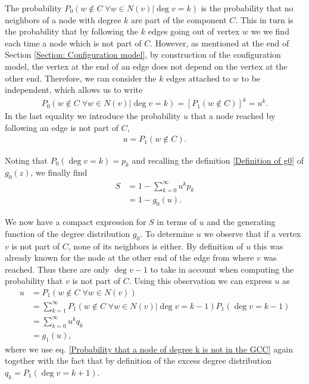 \documentclass[
11pt, %
american, %
singlespacing, %
final, %
nolistspacing, %
liststotoc, %
headsepline, %
]{MastersDoctoralThesis} %
\begin{document}
The probability $P_0(w \notin C\; \forall w \in N(v)|\deg{v} = k)$ is the probability that no neighbors of a node with degree $k$ are part of the component $C$. This in turn is the probability that by following the $k$ edges going out of vertex $w$ we we find each time a node which is not part of $C$. However, as mentioned at the end of Section \ref{Section: Configuration model}, by construction of the configuration model, the vertex at the end of an edge does not depend on the vertex at the other end. Therefore, we can consider the $k$ edges attached to $w$ to be independent, which allows us to write
\begin{align}
	P_0(w \notin C\; \forall w \in N(v)|\deg{v} = k) = \left[P_1(w \notin C)\right]^k = u^k. \label{Probability that a node of degree k is not in the GCC}
\end{align}
In the last equality we introduce the probability $u$ that a node reached by following an edge is not part of $C$,
\begin{align}
	u = P_1(w \notin C). \label{Definition of u}
\end{align}

Noting that $P_0(\deg{v} = k) = p_k$ and recalling the definition \eqref{Definition of g0} of $g_0(z)$, we finally find
\begin{align}
	S	&= 1 - \sum_{k=0}^\infty u^k p_k \\
		&= 1 - g_0(u).
\end{align}

We now have a compact expression for $S$ in terms of $u$ and the generating function of the degree distribution $g_0$. To determine $u$ we observe that if a vertex $v$ is not part of $C$, none of its neighbors is either. By definition of $u$ this was already known for the node at the other end of the edge from where $v$ was reached. Thus there are only $\deg{v} - 1$ to take in account when computing the probability that $v$ is not part of $C$. Using this observation we can express $u$ as
\begin{align}
	u 	&= P_1(w \notin C \; \forall w \in N(v)) \\
		&= \sum_{k=1}^\infty P_1(w \notin C \; \forall w \in N(v)| \deg{v} = k - 1) P_1(\deg{v} = k - 1) \\
		&= \sum_{k=0}^\infty u^k q_k \\
		&= g_1(u),
\end{align}
where we use eq. \eqref{Probability that a node of degree k is not in the GCC} again together with the fact that by definition of the excess degree distribution $q_k = P_1(\deg{v} = k + 1)$.
\end{document}
